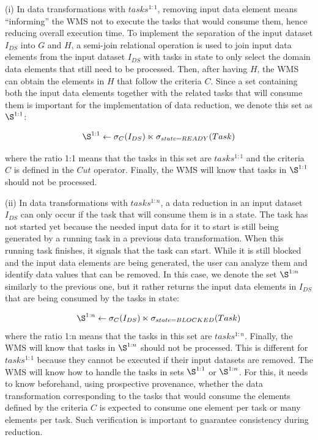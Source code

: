 (i) In data transformations with $tasks^{1:1}$, removing input data
element means ``informing'' the WMS not to execute the tasks that would
consume them, hence reducing overall execution time.
To implement the separation of the input dataset $I_{DS}$ into $G$ and $H$, a semi-join relational operation \cite{Ozsu2011Principles}
is used to join input data elements from the input dataset $I_{DS}$
with tasks in  state to only select the domain data
elements that still need to be processed. Then, after having $H$,
the WMS can obtain the elements in $H$ that follow the criteria
$C$.
Since a set containing both the input data elements together with
the related tasks that will consume them is important for the
implementation of data reduction, we denote this set as $\S^{1:1}$:

$$\S^{1:1} \leftarrow \sigma_C(I_{DS}) \ltimes \sigma_{state = READY}(Task)$$

\noindent where the ratio 1:1 means that the tasks in this set are
$tasks^{1:1}$ and the
criteria $C$ is defined in the $Cut$ operator. Finally, the
WMS will know that tasks in $\S^{1:1}$ should not be processed.

(ii) In data transformations with $tasks^{1:n}$, a data reduction in an
input dataset $I_{DS}$ can only occur if the task that will consume
them is in a  state.
The task has not started yet because the
needed input data for it to start is still being generated by a running
task in a previous data transformation. When this running task finishes, it signals
that the  task can start. While it is still blocked and the input
data elements are being generated, the user can analyze them and
identify data values that can be removed. In this case, we denote the
set $\S^{1:n}$ similarly to the previous one, but it rather returns the
input data elements in $I_{DS}$ that are being consumed by the tasks in
 state:



$$
\S^{1:n} \leftarrow  \sigma_C(I_{DS}) \ltimes \sigma_{state=BLOCKED}(Task)
$$
where the ratio 1:n means that the tasks in this set are
$tasks^{1:n}$. Finally, the WMS will know that tasks in $\S^{1:n}$
should not be processed. This is different for
$tasks^{1:1}$ because they cannot be executed if their input
datasets are removed. 
The WMS will know how to handle the tasks in
sets $\S^{1:1}$ or $\S^{1:n}$. For this, it needs to know beforehand, using prospective provenance, 
whether the data transformation corresponding to the tasks that would consume the elements defined
by the criteria $C$ is expected to consume one element per task or many elements per task.
Such verification is important to guarantee
consistency during reduction.



